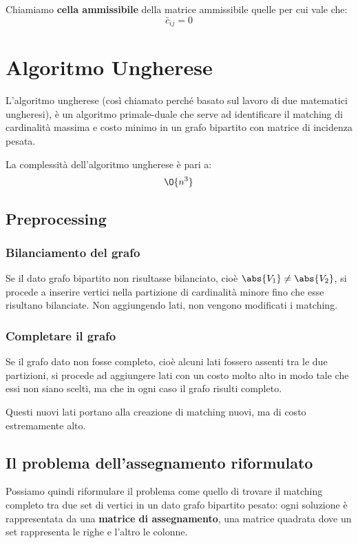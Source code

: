 \documentclass[\main/main.tex]{subfiles}
\begin{document}
\begin{definition}
	Chiamiamo \textbf{cella ammissibile} della matrice ammissibile quelle per cui vale che:
	\[
		\bar{c}_{ij} = 0
	\]
\end{definition}

\clearpage
\chapter{Algoritmo Ungherese}
L'algoritmo ungherese (così chiamato perché basato sul lavoro di due matematici ungheresi), è un algoritmo primale-duale che serve ad identificare il matching di cardinalità massima e costo minimo in un grafo bipartito con matrice di incidenza pesata.

\begin{complexity}
	La complessità dell'algoritmo ungherese è pari a:
	\[
		\O{n^3}
	\]
\end{complexity}

\section{Preprocessing}
\subsection{Bilanciamento del grafo}
Se il dato grafo bipartito non risultasse bilanciato, cioè \(\abs{V_1} \neq \abs{V_2}\), si procede a inserire vertici nella partizione di cardinalità minore fino che esse risultano bilanciate. Non aggiungendo lati, non vengono modificati i matching.

\subsection{Completare il grafo}
Se il grafo dato non fosse completo, cioè alcuni lati fossero assenti tra le due partizioni, si procede ad aggiungere lati con un costo molto alto in modo tale che essi non siano scelti, ma che in ogni caso il grafo risulti completo.

Questi nuovi lati portano alla creazione di matching nuovi, ma di costo estremamente alto.

\section{Il problema dell'assegnamento riformulato}
Possiamo quindi riformulare il problema come quello di trovare il matching completo tra due set di vertici in un dato grafo bipartito pesato: ogni soluzione è rappresentata da una \textbf{matrice di assegnamento}, una matrice quadrata dove un set rappresenta le righe e l'altro le colonne.
\end{document}
